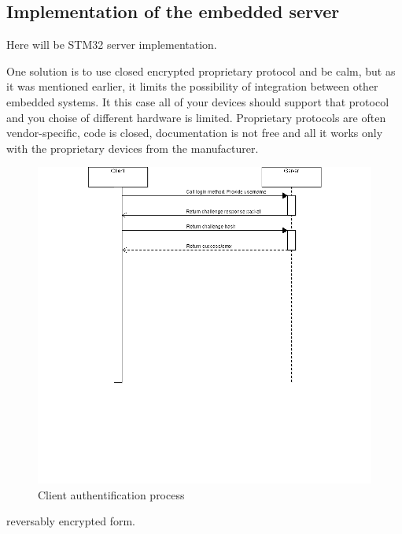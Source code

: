 \newpage
\subsection{Implementation of the embedded server}
Here will be STM32 server implementation.







 One solution is to use closed encrypted proprietary
protocol and be calm, but as it was mentioned earlier, it limits the possibility of integration
between other embedded systems. It this case all of your devices should support
that protocol and you choise of different hardware is limited. Proprietary
protocols are often vendor-specific, code is closed, documentation is not free
and all it works only with the proprietary devices from the manufacturer.


\begin{center}
 \begin{figure}[h]
	\includegraphics[width=\textwidth]{../images/implementation/embedded_server/SequenceDiagram.png}
	\caption{Client authentification process}
	\label{fig:embedded_server_login_auth}
 \end{figure}
\end{center}


reversably encrypted form.

